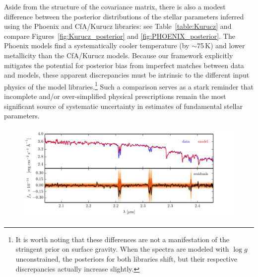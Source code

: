 \documentclass[iop,floatfix,numberedappendix,twocolappendix]{emulateapj}
\begin{document}
Aside from the structure of the covariance matrix, there is also a modest difference between the 
posterior distributions of the stellar parameters inferred using the {\sc Phoenix} and {\sc 
CfA/Kurucz} libraries: see Table~\ref{table:Kurucz} and compare Figures~\ref{fig:Kurucz_posterior} 
and \ref{fig:PHOENIX_posterior}.  The {\sc Phoenix} models find a systematically cooler temperature 
(by $\sim$75\,K) and lower metallicity than the {\sc CfA/Kurucz} models.  Because our framework 
explicitly mitigates the potential for posterior bias from imperfect matches between data and 
models, these apparent discrepancies must be intrinsic to the different input physics of the model 
libraries.\footnote{It is worth noting that these differences are not a manifestation of the 
stringent prior on surface gravity.  When the spectra are modeled with $\log g$ unconstrained, the 
posteriors for both libraries shift, but their respective discrepancies actually increase 
slightly.}  Such a comparison serves as a stark reminder that incomplete and/or over-simplified 
physical prescriptions remain the most significant source of systematic uncertainty in estimates of 
fundamental stellar parameters.

\begin{figure}[!htb]
  \includegraphics{figs/residuals_Gl51_logg.pdf}
\vspace{-0.3cm}
\vspace{0.2cm}
\end{figure}
\end{document}
